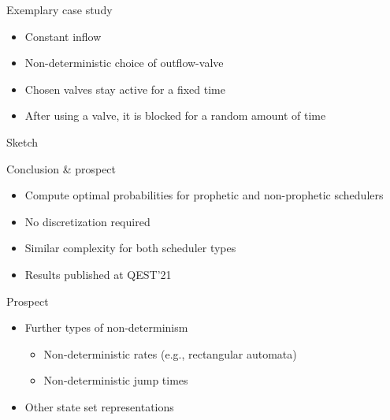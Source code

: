 \documentclass[aspectratio=169]{beamer}
\begin{document}
\begin{frame}{Exemplary case study}
  \begin{minipage}[t]{.6\linewidth}
    \begin{itemize}
      \item Constant inflow
      \item Non-deterministic choice of outflow-valve
      \item Chosen valves stay active for a fixed time
      \item After using a valve, it is blocked for a random amount of time
    \end{itemize}
  \end{minipage}%
  \begin{minipage}[t]{.4\linewidth}
    \centering
    Sketch

    
  \end{minipage}%

  \bigskip

\end{frame}


\begin{frame}{Conclusion \& prospect}

\begin{itemize}
  \item Compute optimal probabilities for prophetic and non-prophetic schedulers
  \item No discretization required
  \item Similar complexity for both scheduler types
  \item Results published at QEST'21
\end{itemize}

\bigskip

Prospect
\begin{itemize}
  \item Further types of non-determinism
  \begin{itemize}
    \item Non-deterministic rates (e.g., rectangular automata)
    \item Non-deterministic jump times
  \end{itemize}
  \item Other state set representations
\end{itemize}

\end{frame}

\end{document}
